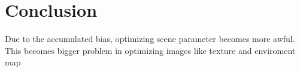 \section*{Conclusion}\label{ch:ch5label}

Due to the accumulated bias, optimizing scene parameter becomes more awful. This becomes bigger problem in optimizing images like texture and enviroment map